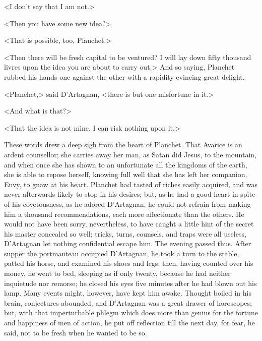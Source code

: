 <I don't say that I am not.>

<Then you have some new idea?>

<That is possible, too, Planchet.>

<Then there will be fresh capital to be ventured? I will lay down fifty thousand livres upon the idea you are about to carry out.> And so saying, Planchet rubbed his hands one against the other with a rapidity evincing great delight.

<Planchet,> said D'Artagnan, <there is but one misfortune in it.>

<And what is that?>

<That the idea is not mine. I can risk nothing upon it.>

These words drew a deep sigh from the heart of Planchet. That Avarice is an ardent counsellor; she carries away her man, as Satan did Jesus, to the mountain, and when once she has shown to an unfortunate all the kingdoms of the earth, she is able to repose herself, knowing full well that she has left her companion, Envy, to gnaw at his heart. Planchet had tasted of riches easily acquired, and was never afterwards likely to stop in his desires; but, as he had a good heart in spite of his covetousness, as he adored D'Artagnan, he could not refrain from making him a thousand recommendations, each more affectionate than the others. He would not have been sorry, nevertheless, to have caught a little hint of the secret his master concealed so well; tricks, turns, counsels, and traps were all useless, D'Artagnan let nothing confidential escape him. The evening passed thus. After supper the portmanteau occupied D'Artagnan, he took a turn to the stable, patted his horse, and examined his shoes and legs; then, having counted over his money, he went to bed, sleeping as if only twenty, because he had neither inquietude nor remorse; he closed his eyes five minutes after he had blown out his lamp. Many events might, however, have kept him awake. Thought boiled in his brain, conjectures abounded, and D'Artagnan was a great drawer of horoscopes; but, with that imperturbable phlegm which does more than genius for the fortune and happiness of men of action, he put off reflection till the next day, for fear, he said, not to be fresh when he wanted to be so.


